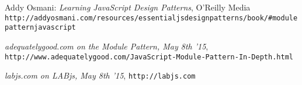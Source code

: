 \documentclass{bioinfo}
\begin{document}
%
%
%
%
%
%
%
%
%


\begin{thebibliography}{}


 Addy Osmani: \emph{Learning JavaScript Design Patterns}, O'Reilly Media \verb|http://addyosmani.com/resources/essentialjsdesignpatterns/book/#modulepatternjavascript|

 \emph{adequatelygood.com on the Module Pattern, May 8th '15}, \verb|http://www.adequatelygood.com/JavaScript-Module-Pattern-In-Depth.html|

 \emph{labjs.com on LABjs, May 8th '15}, \verb|http://labjs.com|

\end{thebibliography}
\end{document}
